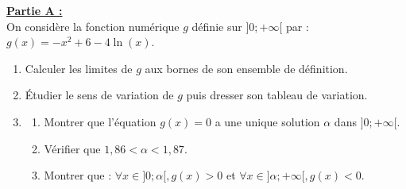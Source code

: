 \documentclass[12pt,a4paper]{article}
\begin{document}
\vspace{0.5cm}

\noindent \underline{\textbf{Partie A :}} \\
On considère la fonction numérique $g$ définie sur $]0; +\infty[$ par : $g(x) = -x^2 + 6 - 4\ln(x)$.
\begin{enumerate}
    \item Calculer les limites de $g$ aux bornes de son ensemble de définition.
    \item Étudier le sens de variation de $g$ puis dresser son tableau de variation.
    \item 
    \begin{enumerate}
        \item Montrer que l'équation $g(x) = 0$ a une unique solution $\alpha$ dans $]0; +\infty[$.
        \item Vérifier que $1,86 < \alpha < 1,87$.
        \item Montrer que : $\forall x \in ]0; \alpha[, g(x) > 0$ et $\forall x \in ]\alpha; +\infty[, g(x) < 0$.
    \end{enumerate}
\end{enumerate}

\vspace{0.5cm}
\end{document}
